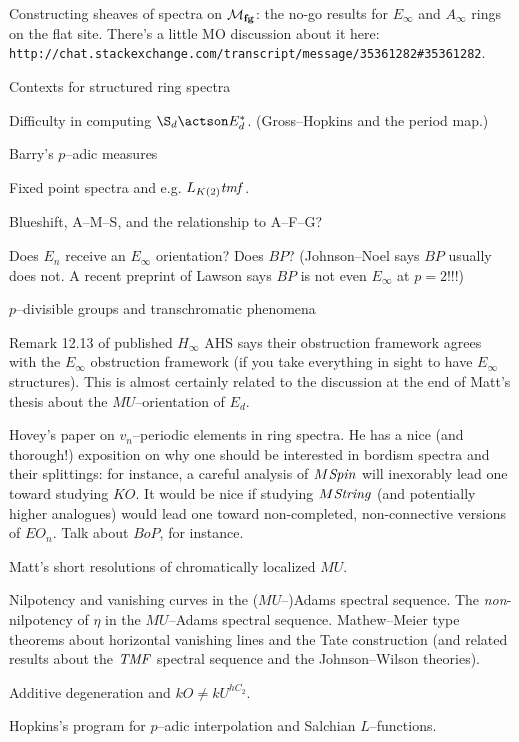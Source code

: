 Constructing sheaves of spectra on $\mathcal{M}_{\mathbf{fg}}$: the no-go results for $E_\infty$ and $A_\infty$ rings on the flat site.  There's a little MO discussion about it here: \texttt{http://chat.stackexchange.com/transcript/message/35361282\#35361282}.

Contexts for structured ring spectra

Difficulty in computing $\S_d \actson E_d^*$. (Gross--Hopkins and the period map.)

Barry's $p$--adic measures

Fixed point spectra and e.g. $L_{K(2)} \mathit{tmf}$.

Blueshift, A--M--S, and the relationship to A--F--G?

Does $E_n$ receive an $E_\infty$ orientation?  Does $BP$?  (Johnson--Noel says $BP$ usually does not.  A recent preprint of Lawson says $BP$ is not even $E_\infty$ at $p = 2$!!!)

$p$--divisible groups and transchromatic phenomena

Remark 12.13 of published $H_\infty$ AHS says their obstruction framework agrees with the $E_\infty$ obstruction framework (if you take everything in sight to have $E_\infty$ structures).  This is almost certainly related to the discussion at the end of Matt's thesis about the $MU$--orientation of $E_d$.

Hovey's paper on $v_n$--periodic elements in ring spectra.  He has a nice (and thorough!) exposition on why one should be interested in bordism spectra and their splittings: for instance, a careful analysis of $M\mathit{Spin}$ will inexorably lead one toward studying $KO$.  It would be nice if studying $M\mathit{String}$ (and potentially higher analogues) would lead one toward non-completed, non-connective versions of $EO_n$.  Talk about $BoP$, for instance.

Matt's short resolutions of chromatically localized $MU$.

Nilpotency and vanishing curves in the ($MU$--)Adams spectral sequence.  The \emph{non}-nilpotency of $\eta$ in the $MU$--Adams spectral sequence.  Mathew--Meier type theorems about horizontal vanishing lines and the Tate construction (and related results about the $\mathit{TMF}$ spectral sequence and the Johnson--Wilson theories).

Additive degeneration and $kO \ne kU^{hC_2}$.

Hopkins's program for $p$--adic interpolation and Salchian $L$--functions.

